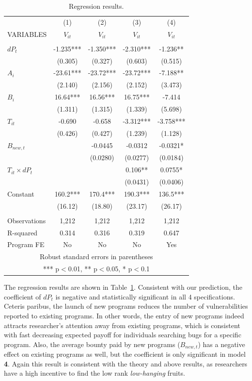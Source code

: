 \begin{table}
	\centering
	\caption{Regression results.}
	\begin{tabular}{lcccc} \hline
		& (1) & (2) & (3) & (4) \\
		VARIABLES & $V_{it}$ & $V_{it}$ & $V_{it}$ & $V_{it}$ \\ \hline
		&  &  &  &  \\
		$dP_t$ & -1.235*** & -1.350*** & -2.310*** & -1.236** \\
		& (0.305) & (0.327) & (0.603) & (0.515) \\
		$A_i$ & -23.61*** & -23.72*** & -23.72*** & -7.188** \\
		& (2.140) & (2.156) & (2.152) & (3.473) \\
		$B_i$ & 16.64*** & 16.56*** & 16.75*** & -7.414 \\
		& (1.311) & (1.315) & (1.339) & (5.698) \\
		$T_{it}$ & -0.690 & -0.658 & -3.312*** & -3.758*** \\
		& (0.426) & (0.427) & (1.239) & (1.128) \\
		$B_{new,t}$ &  & -0.0445 & -0.0312 & -0.0321* \\
		&  & (0.0280) & (0.0277) & (0.0184) \\
		$T_{it} \times dP_t$ &  &  & 0.106** & 0.0755* \\
		&  &  & (0.0431) & (0.0406) \\
		Constant & 160.2*** & 170.4*** & 190.3*** & 136.5*** \\
		& (16.12) & (18.80) & (23.17) & (26.17) \\
		&  &  &  &  \\
		Observations & 1,212 & 1,212 & 1,212 & 1,212 \\
		R-squared & 0.314 & 0.316 & 0.319 & 0.647 \\
		Program FE & No & No & No & Yes \\ \hline
		\multicolumn{5}{c}{ Robust standard errors in parentheses} \\
		\multicolumn{5}{c}{ *** p$<$0.01, ** p$<$0.05, * p$<$0.1} \\
	\end{tabular}
	
	\label{tab:reg}
\end{table}

\noindent The regression results are shown in Table~\ref{tab:reg}. Consistent with our prediction, the coefficient of $dP_t$ is negative and statistically significant in all 4 specifications. Ceteris paribus, the launch of new programs reduces the number of vulnerabilities reported to existing programs. In other words, the entry of new programs indeed attracts researcher's attention away from existing programs, which is consistent with fast decreasing expected payoff for individuals searching bugs for a specific program. Also, the average bounty paid by new programs ($B_{new,t}$) has a negative effect on existing programs as well, but the coefficient is only significant in model {\bf 4}. Again this result is consistent with the theory and above results, as researchers have a high incentive to find the low rank {\it low-hanging} fruits.\\

